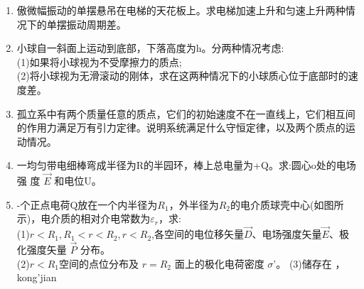 \begin{enumerate}
\item 傲微幅振动的单摆悬吊在电梯的天花板上。求电梯加速上升和匀速上升两种情况下的单摆振动周期差。
\item 小球自一斜面上运动到底部，下落高度为h。分两种情况考虑:\\
(1)如果将小球视为不受摩擦力的质点;\\
(2)将小球视为无滑滚动的刚体，求在这两种情况下的小球质心位于底部时的速度差。
\item 孤立系中有两个质量任意的质点，它们的初始速度不在一直线上，它们相互间的作用力满足万有引力定律。说明系统满足什么守恒定律，以及两个质点的运动情况。
\item 一均匀带电细棒弯成半径为R的半园环，棒上总电量为+Q。求:圆心o处的电场强
度 $\vec{E}$ 和电位U。
\item -个正点电荷Q放在一个内半径为$R_1$，外半径为$R_2$的电介质球壳中心(如图所示)，电介质的相对介电常数为$\varepsilon_r$，求:\\
(1)$r<R_1,R_1<r<R_2,r<R_2$,各空间的电位移矢量$\vec D$、电场强度矢量$\vec{E}$、极化强度矢量 $\vec P$ 分布。\\
(2)$r<R_1$空间的点位分布及 $r=R_2$ 面上的极化电荷密度 $\sigma$'。
(3)储存在  ，kong'jian
\end{enumerate}
